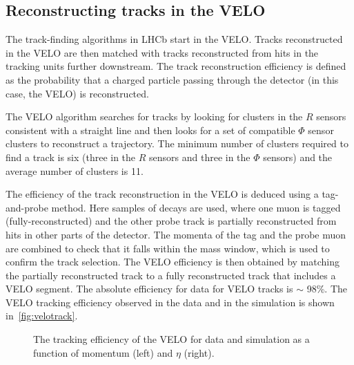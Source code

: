 \subsection{Reconstructing tracks in the VELO}

The track-finding algorithms in LHCb start in the VELO. Tracks reconstructed in the VELO are then matched with tracks reconstructed from hits in the tracking units further downstream.
The track reconstruction efficiency is defined as the probability that a charged particle passing through the detector (in this case, the VELO) is reconstructed. %

The VELO algorithm searches for tracks by looking for clusters in the $R$ sensors consistent with a straight line and then looks for a set of compatible $\Phi$ sensor clusters to reconstruct a trajectory. The minimum number of clusters required to find a track is six (three in the $R$ sensors and three in the $\Phi$ sensors) and the average number of clusters is 11.

The efficiency of the track reconstruction in the VELO is deduced using a tag-and-probe method. Here samples of \jpsi\to\mup\mun decays are used, where one muon is tagged (fully-reconstructed) and the other probe track is partially reconstructed from hits in other parts of the detector. The momenta of the tag and the probe muon are combined to check that it falls within the \jpsi mass window, which is used to confirm the track selection. The VELO efficiency is then obtained by matching the partially reconstructed track to a fully reconstructed track that includes a VELO segment. The absolute efficiency for data for VELO tracks is $\sim$ 98\%. The VELO tracking efficiency observed in the data and in the simulation is shown in~\autoref{fig:velotrack}.


\begin{figure}
  \centering
    \caption{The tracking efficiency of the VELO for data and simulation as a function of momentum (left) and $\eta$ (right).
  }%
  \label{fig:velotrack}
\end{figure}



